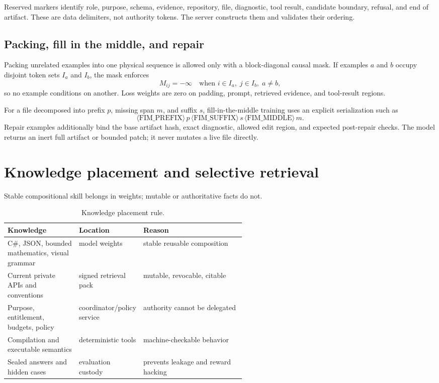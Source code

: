 \documentclass[10pt,letterpaper]{article}
\newcommand{\1}{\mathbb{1}}
\begin{document}
Reserved markers identify role, purpose, schema, evidence, repository, file, diagnostic, tool result,
candidate boundary, refusal, and end of artifact.  These are data delimiters, not authority tokens.
The server constructs them and validates their ordering.

\subsection{Packing, fill in the middle, and repair}

Packing unrelated examples into one physical sequence is allowed only with a block-diagonal causal
mask.  If examples $a$ and $b$ occupy disjoint token sets $I_a$ and $I_b$, the mask enforces
\begin{equation}
  M_{ij}=-\infty
  \quad\text{when }i\in I_a,\;j\in I_b,\;a\ne b,
  \label{eq:packing-mask}
\end{equation}
so no example conditions on another.  Loss weights are zero on padding, prompt, retrieved evidence,
and tool-result regions.

For a file decomposed into prefix $p$, missing span $m$, and suffix $s$, fill-in-the-middle training
uses an explicit serialization such as
\begin{equation}
  \langle\mathrm{FIM\_PREFIX}\rangle\,p\,
  \langle\mathrm{FIM\_SUFFIX}\rangle\,s\,
  \langle\mathrm{FIM\_MIDDLE}\rangle\,m.
  \label{eq:fim-order}
\end{equation}
Repair examples additionally bind the base artifact hash, exact diagnostic, allowed edit region, and
expected post-repair checks.  The model returns an inert full artifact or bounded patch; it never
mutates a live file directly.

\section{Knowledge placement and selective retrieval}

Stable compositional skill belongs in weights; mutable or authoritative facts do not.
\begin{table}[h]
\centering
\caption{Knowledge placement rule.}
\label{tab:knowledge-placement}
\small
\begin{tabularx}{\linewidth}{@{}L{0.30\linewidth}L{0.25\linewidth}Y@{}}
\toprule
Knowledge & Location & Reason \\
\midrule
C\#, JSON, bounded mathematics, visual grammar & model weights & stable reusable composition \\
Current private APIs and conventions & signed retrieval pack & mutable, revocable, citable \\
Purpose, entitlement, budgets, policy & coordinator/policy service & authority cannot be delegated \\
Compilation and executable semantics & deterministic tools & machine-checkable behavior \\
Sealed answers and hidden cases & evaluation custody & prevents leakage and reward hacking \\
\bottomrule
\end{tabularx}
\end{table}
\end{document}
